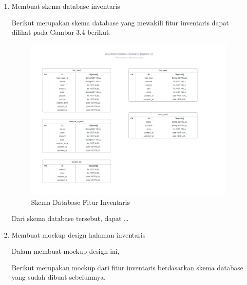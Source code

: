 \begin{enumerate}
	\item Membuat skema database inventaris
	
	Berikut merupakan skema database yang mewakili fitur inventaris dapat dilihat pada Gambar 3.4 berikut.

	\begin{figure}[H]
		\centering
		\includegraphics[width=1\textwidth]{gambar/akbar/sprint1/sprint1_inventaris_database.jpeg}
		\caption{Skema Database Fitur Inventaris}
	\end{figure}

	Dari skema database tersebut, dapat  \dots

	\item Membuat mockup design halaman inventaris
	
	Dalam membuat mockup design ini, 

	Berikut merupakan mockup dari fitur inventaris berdasarkan skema database yang sudah dibuat sebelumnya.
\end{enumerate}